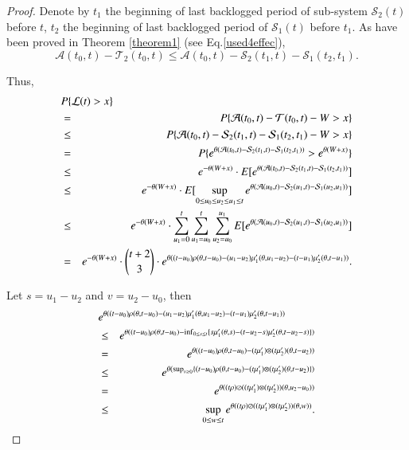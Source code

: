 \documentclass[paper]{ieice}
\newtheorem{proof}{Proof}
\begin{document}
\begin{proof}
Denote by $t_1$ the beginning of last backlogged period of sub-system $\mathcal{S}_2(t)$ before $t$, $t_2$ the beginning of last backlogged period of $\mathcal{S}_1(t)$ before $t_1$. As have been proved in Theorem \ref{theorem1} (see Eq.\ref{used4effec}),
$$\mathcal{A}(t_0,t)-\mathcal{T}_2(t_0,t) \leq \mathcal{A}(t_0,t)-\mathcal{S}_2(t_1,t)-\mathcal{S}_1(t_2,t_1).$$

Thus,
\begin{eqnarray*}
\lefteqn{P\{\mathcal{L}(t)>x\}}\\
&=&P\{\mathcal{A}(t_0,t)-\mathcal{T}(t_0,t)-W>x\}\\
&\leq&P\{\mathcal{A}(t_0,t)-\mathcal{S}_2(t_1,t)-\mathcal{S}_1(t_2,t_1)-W>x\}\\
&=&P\{e^{\theta(\mathcal{A}(t_0,t)-\mathcal{S}_2(t_1,t)-\mathcal{S}_1(t_2,t_1))}>e^{\theta(W+x)}\}\\
&\leq& e^{-\theta (W+x)}\cdot E[e^{\theta(\mathcal{A}(t_0,t)-\mathcal{S}_2(t_1,t)-\mathcal{S}_1(t_2,t_1))}]\\
&\leq& e^{-\theta (W+x)}\cdot E[\sup_{0\leq u_0\leq u_2\leq u_1\leq t}e^{\theta(\mathcal{A}(u_0,t)-\mathcal{S}_2(u_1,t)-\mathcal{S}_1(u_2,u_1))}]\\
&\leq& e^{-\theta (W+x)}\cdot \sum_{u_1=0}^t\sum_{u_1=u_0} ^t\sum_{u_2=u_0}^{u_1}E[e^{\theta(\mathcal{A}(u_0,t)-\mathcal{S}_2(u_1,t)-\mathcal{S}_1(u_2,u_1))}]\\
&=& e^{-\theta (W+x)}\cdot {t+2\choose 3}\cdot e^{\theta((t-u_0)\rho(\theta,t-u_0)-(u_1-u_2)\mu_1^\prime(\theta,u_1-u_2)-(t-u_1)\mu_2^\prime(\theta,t-u_1))}.
\end{eqnarray*}

Let $s=u_1-u_2$ and $v=u_2-u_0$, then
\begin{eqnarray*}
\lefteqn{e^{\theta((t-u_0)\rho(\theta,t-u_0)-(u_1-u_2)\mu_1^\prime(\theta,u_1-u_2)-(t-u_1)\mu_2^\prime(\theta,t-u_1))}}\\
&\leq & e^{\theta((t-u_0)\rho(\theta,t-u_0)-\inf_{0\leq s\leq t}\{s\mu_1^\prime(\theta,s)-(t-u_2-s)\mu_2^\prime(\theta,t-u_2-s)\})}\\
&=& e^{\theta((t-u_0)\rho(\theta,t-u_0)-(t\mu_1^\prime)\otimes(t\mu_2^\prime)(\theta,t-u_2))}\\
&\leq & e^{\theta(\sup_{v\geq 0}\{(t-u_0)\rho(\theta,t-u_0)-(t\mu_1^\prime)\otimes(t\mu_2^\prime)(\theta,t-u_2)\})}\\
&=& e^{\theta((t\rho)\oslash((t\mu_1^\prime)\otimes(t\mu_2^\prime))(\theta,u_2-u_0))}\\
&\leq& \sup_{0\leq w\leq t}e^{\theta((t\rho)\oslash((t\mu_1^\prime)\otimes(t\mu_2^\prime))(\theta,w))}.
\end{eqnarray*}


\end{proof}
\end{document}
